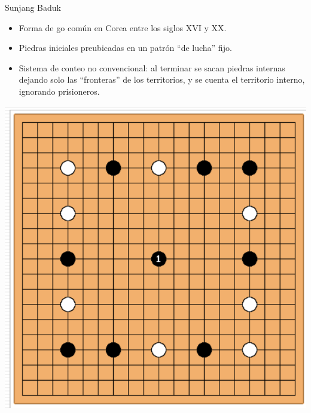 \documentclass{beamer}
\begin{document}
\begin{frame}{Sunjang Baduk}
    \begin{itemize}
        \item Forma de go común en Corea entre los siglos XVI y XX.
        \item Piedras iniciales preubicadas en un patrón ``de lucha'' fijo. 
        \item Sistema de conteo no convencional: al terminar se sacan piedras internas dejando solo las ``fronteras'' de los territorios, y se cuenta el territorio interno, ignorando prisioneros.
    \end{itemize}
    
    {\hfill \includegraphics[scale=0.2]{sunjang-baduk.png} \hfill}
    
\end{frame}
\end{document}
